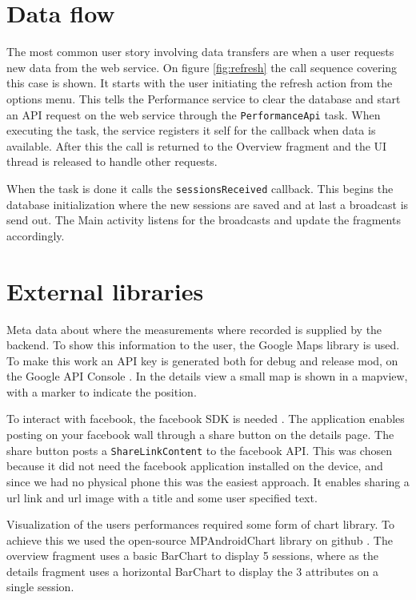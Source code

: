 \section{Data flow}
The most common user story involving data transfers are when a user requests new data from the web service. On figure \ref{fig:refresh} the call sequence covering this case is shown. It starts with the user initiating the refresh action from the options menu. This tells the Performance service to clear the database and start an API request on the web service through the \verb|PerformanceApi| task. When executing the task, the service registers it self for the callback when data is available. After this the call is returned to the Overview fragment and the UI thread is released to handle other requests.

When the task is done it calls the \verb|sessionsReceived| callback. This begins the database initialization where the new sessions are saved and at last a broadcast is send out. The Main activity listens for the broadcasts and update the fragments accordingly.


\section{External libraries}
Meta data about where the measurements where recorded is supplied by the backend. To show this information to the user, the Google Maps library is used. To make this work an API key is generated both for debug and release mod, on the Google API Console \citep{google:console}. In the details view a small map is shown in a mapview, with a marker to indicate the position.

To interact with facebook, the facebook SDK is needed \citep{facebook:started}. The application enables posting on your facebook wall through a share button on the details page. The share button posts a \verb|ShareLinkContent| to the facebook API. This was chosen because it did not need the facebook application installed on the device, and since we had no physical phone this was the easiest approach. It enables sharing a url link and url image with a title and some user specified text.

Visualization of the users performances required some form of chart library. To achieve this we used the open-source MPAndroidChart library on github \citep{mpcharts}. The overview fragment uses a basic BarChart to display 5 sessions, where as the details fragment uses a horizontal BarChart to display the 3 attributes on a single session.


